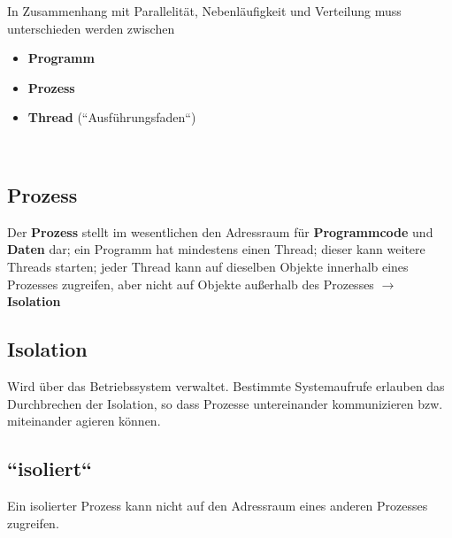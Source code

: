 In Zusammenhang mit Parallelität, Nebenläufigkeit und Verteilung muss unterschieden werden zwischen

\begin{itemize}
    \item \textbf{Programm}
    \item  \textbf{Prozess}
    \item \textbf{Thread} (``Ausführungsfaden``)
\end{itemize}\\

\subsection*{Prozess}
Der \textbf{Prozess} stellt im wesentlichen den Adressraum für \textbf{Programmcode} und \textbf{Daten} dar; ein Programm hat mindestens einen Thread; dieser kann weitere Threads starten; jeder Thread kann auf dieselben Objekte innerhalb eines Prozesses zugreifen, aber nicht auf Objekte außerhalb des Prozesses $\rightarrow$ \textbf{Isolation}

\subsection*{Isolation}
Wird über das Betriebssystem verwaltet. Bestimmte Systemaufrufe erlauben das Durchbrechen der Isolation, so dass Prozesse untereinander kommunizieren bzw. miteinander agieren können.

\subsection*{``isoliert``}
Ein isolierter Prozess kann nicht auf den Adressraum eines anderen Prozesses zugreifen.
